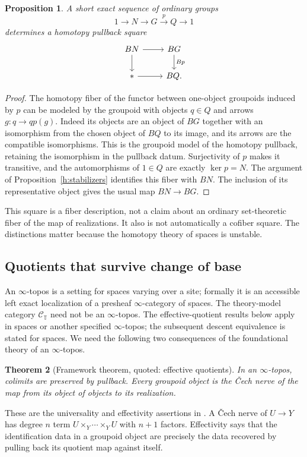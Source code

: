 \documentclass[11pt]{article}
\newtheorem{theorem}{Theorem}[section]
\newtheorem{proposition}[theorem]{Proposition}
\theoremstyle{definition}
\theoremstyle{remark}\newtheorem{remark}[theorem]{Remark}
\begin{document}
\begin{proposition}\label{h:extension-fiber}
A short exact sequence of ordinary groups
\[
 1\longrightarrow N\longrightarrow G\xrightarrow{p}Q\longrightarrow1
\]
determines a homotopy pullback square
\[
\begin{tikzcd}
 BN \arrow[r] \arrow[d] & BG \arrow[d,"Bp"]\\
 * \arrow[r] & BQ.
\end{tikzcd}
\]
\end{proposition}
\begin{proof}
The homotopy fiber of the functor between one-object groupoids induced by
$p$ can be modeled by the groupoid with objects $q\in Q$ and arrows
$g:q\to q p(g)$.  Indeed its objects are an object of $BG$ together with
an isomorphism from the chosen object of $BQ$ to its image, and its arrows
are the compatible isomorphisms.  This is the groupoid model of the
homotopy pullback, retaining the isomorphism in the pullback datum.
Surjectivity of $p$ makes it transitive, and the automorphisms of $1\in Q$
are exactly $\ker p=N$.  The argument of
Proposition~\ref{h:stabilizers} identifies this fiber with $BN$.
The inclusion of its representative object gives the usual map $BN\to BG$.
\end{proof}

This square is a fiber description, not a claim about an ordinary
set-theoretic fiber of the map of realizations.  It also is not automatically
a cofiber square.  The distinctions matter because the homotopy theory
of spaces is unstable.

\subsection{Quotients that survive change of base}

An $\infty$-topos is a setting for spaces varying over a site; formally it
is an accessible left exact localization of a presheaf $\infty$-category
of spaces.  The theory-model category $\mathcal C_{\mathbb T}$ need not
be an $\infty$-topos.  The effective-quotient results below apply in spaces
or another specified $\infty$-topos; the subsequent descent equivalence
is stated for spaces.  We need the following two consequences of the
foundational theory of an $\infty$-topos.

\begin{theorem}[Framework theorem, quoted: effective quotients]
\label{h:topos-foundation}
In an $\infty$-topos, colimits are preserved by pullback.  Every groupoid
object is the \v{C}ech nerve of the map from its object of objects to its
realization.
\end{theorem}
These are the universality and effectivity assertions in
\cite[Theorem 6.1.0.6]{HTT}.  A \v{C}ech nerve of $U\to Y$ has degree
$n$ term $U\times_Y\cdots\times_Y U$ with $n+1$ factors.  Effectivity
says that the identification data in a groupoid object are precisely the
data recovered by pulling back its quotient map against itself.
\end{document}
